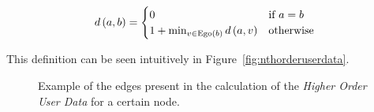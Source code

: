 \begin{equation}
d \left( a, b \right) =
\begin{cases}
	0 & \text{if } a = b \\
	1 + \min_{v \in \operatorname{Ego} \left(b \right)} d \left( a, v \right) & \text{otherwise}
\end{cases}
\label{eq:distance}
\end{equation}

This definition can be seen intuitively in Figure~\ref{fig:nthorderuserdata}.

\begin{figure}
\centering
{}
\caption{Example of the edges present in the calculation of the \emph{Higher Order User Data} for a certain node.}
\label{fig:higherorderuserdata}
\end{figure}
